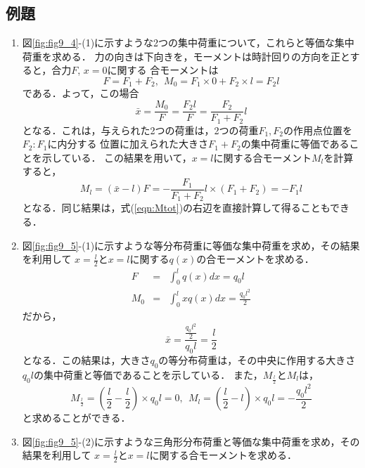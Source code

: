 \documentclass[10pt,a4j]{jbook}
\begin{document}
\subsection{例題}
\begin{enumerate}
\item
図\ref{fig:fig9_4}-(1)に示すような2つの集中荷重について，これらと等価な集中荷重を求める．
力の向きは下向きを，モーメントは時計回りの方向を正とすると，合力$F$, $x=0$に関する
合モーメントは
\begin{equation}
	F=F_1+F_2, \ \ M_0=F_1\times 0 + F_2 \times l =F_2l
	\label{eqn:ans1_1}
\end{equation}
である．よって，この場合
\begin{equation}
	\bar x = \frac{M_0}{F}=\frac{F_2l}{F}= \frac{F_2}{F_1+F_2}l
	\label{eqn:xbar1_1}
\end{equation}
となる．これは，与えられた2つの荷重は，2つの荷重$F_1,F_2$の作用点位置を$F_2:F_1$に内分する
位置に加えられた大きさ$F_1+F_2$の集中荷重に等価であることを示している．
この結果を用いて，$x=l$に関する合モーメント$M_l$を計算すると，
\begin{equation}
	M_l=(\bar x- l ) F = -\frac{F_1}{F_1+F_2}l \times (F_1+F_2)= -F_1l
	\label{eqn:Ml1_1}
\end{equation}
となる．同じ結果は，式(\ref{eqn:Mtot})の右辺を直接計算して得ることもできる．
\item
図\ref{fig:fig9_5}-(1)に示すような等分布荷重に等価な集中荷重を求め，その結果を利用して
$x=\frac{l}{2}$と$x=l$に関する$q(x)$の合モーメントを求める．
\begin{eqnarray}
	F & =& \int _0^l q(x)dx= q_0l
	\label{eqn:}
	\\
	M_0 & =& \int _0^l xq(x)dx= \frac{q_0l^2}{2}
\end{eqnarray}
だから，
\begin{equation}
	\bar x= \frac{\frac{q_0l^2}{2}}{q_0l}=\frac{l}{2}
	\label{eqn:xbar_rec}
\end{equation}
となる．この結果は，大きさ$q_0$の等分布荷重は，その中央に作用する大きさ$q_0l$の集中荷重と等価であることを示している．
また，$M_{\frac{l}{2}}$と$M_{l}$は，
\begin{equation}
	M_{\frac{l}{2}}=\left(\frac{l}{2}-\frac{l}{2}\right)\times q_0l = 0 ,\ \ 
	M_{l}=\left(\frac{l}{2}-l\right)\times q_0l = -\frac{q_0l^2}{2}
	\label{eqn:}
\end{equation}
と求めることができる．
\item
図\ref{fig:fig9_5}-(2)に示すような三角形分布荷重と等価な集中荷重を求め，その結果を利用して
$x=\frac{l}{2}$と$x=l$に関する合モーメントを求める．

\end{enumerate}
\end{document}
